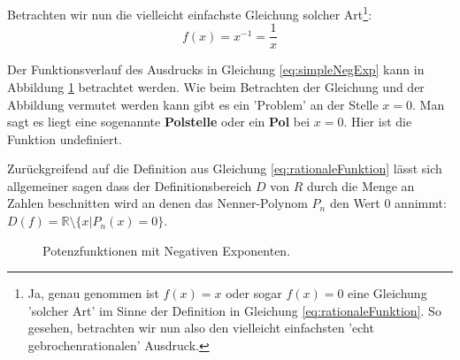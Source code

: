 

Betrachten wir nun die vielleicht einfachste Gleichung solcher Art\footnote{Ja, genau genommen ist $f(x) = x$ oder sogar $f(x) = 0$ eine Gleichung 'solcher Art' im Sinne der Definition in Gleichung \ref{eq:rationaleFunktion}. So gesehen, betrachten wir nun also den vielleicht einfachsten 'echt gebrochenrationalen' Ausdruck.}:
\begin{equation}
	f(x) = x^{-1} = \frac{1}{x} \label{eq:simpleNegExp}
\end{equation}

Der Funktionsverlauf des Ausdrucks in Gleichung \ref{eq:simpleNegExp} kann in Abbildung \ref{fig:ratio1} betrachtet werden. Wie beim Betrachten der Gleichung und der Abbildung vermutet werden kann gibt es ein 'Problem' an der Stelle $x=0$. Man sagt es liegt eine sogenannte \textbf{Polstelle} oder ein \textbf{Pol} bei $x=0$. Hier ist die Funktion undefiniert. 

Zurückgreifend auf die Definition aus Gleichung \ref{eq:rationaleFunktion} lässt sich allgemeiner sagen dass der Definitionsbereich $D$ von $R$ durch die Menge an Zahlen beschnitten wird an denen das Nenner-Polynom $P_n$ den Wert 0 annimmt: $D(f) = \mathbb{R} \setminus \{x | P_n(x)=0\}$. 


\begin{figure}[H]
	\centering
	
	\caption{Potenzfunktionen mit Negativen Exponenten.}
	\label{fig:ratio1}
\end{figure}



